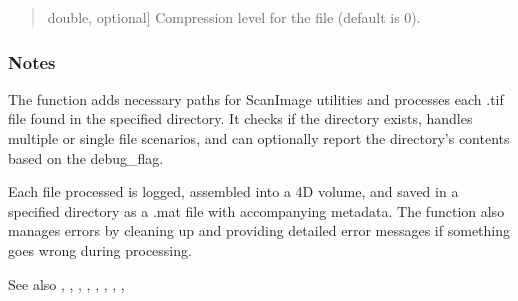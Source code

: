 \documentclass[letterpaper,10pt,english]{sphinxmanual}
\begin{document}
\begin{fulllineitems}
\begin{quote}
\begin{description}
\begin{description}
\sphinxlineitem{\sphinxstylestrong{compression}}{[}double, optional{]}
\sphinxAtStartPar
Compression level for the file (default is 0).

\end{description}

\end{description}\end{quote}
\subsubsection*{Notes}

\sphinxAtStartPar
The function adds necessary paths for ScanImage utilities and processes each .tif
file found in the specified directory. It checks if the directory exists, handles
multiple or single file scenarios, and can optionally report the directory’s contents
based on the debug\_flag.

\sphinxAtStartPar
Each file processed is logged, assembled into a 4D volume, and saved in a specified
directory as a .mat file with accompanying metadata. The function also manages errors
by cleaning up and providing detailed error messages if something goes wrong during
processing.

\sphinxAtStartPar
See also , , , , , , , , 

\end{fulllineitems}

\end{document}
